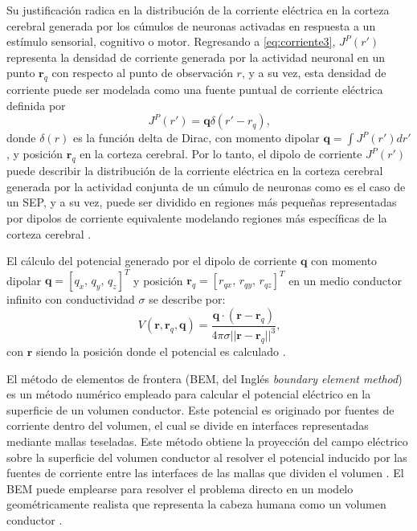 Su justificación radica en la distribución de la corriente eléctrica en la corteza cerebral generada por los cúmulos de neuronas activadas en respuesta a un estímulo sensorial, cognitivo o motor.
Regresando a \cref{eq:corriente3}, $J^{P}(r')$ representa la densidad de corriente generada por la actividad neuronal en un punto $\mathbf{r}_{q}$ con respecto al punto de
observación $r$, y a su vez, esta densidad de corriente puede ser modelada como una fuente puntual de corriente eléctrica definida por
\begin{equation}
	J^{P}(r') = \mathbf{q} \delta(r' - r_{q})\text{,} \label{eq:corriente4}
\end{equation}
donde $\delta(r)$ es la función delta de Dirac, con momento dipolar $\mathbf{q}=\int J^{P}(r') dr'$, y posición $\mathbf{r}_{q}$ en la corteza cerebral.
Por lo tanto, el dipolo de corriente $J^{P}(r')$ puede describir la distribución de la corriente eléctrica en la corteza cerebral generada por la actividad conjunta de un cúmulo de neuronas como es el caso de un SEP, y a su vez, puede ser dividido en regiones más pequeñas representadas por dipolos de corriente equivalente modelando regiones más específicas de la corteza cerebral \cite{Baillet2001}.

El cálculo del potencial generado por el dipolo de corriente $\mathbf{q}$ con momento dipolar  $\mathbf{q} = [q_x,\,q_y,\,q_z]^T$ y posición $\mathbf{r}_{q} = [r_{qx},\,r_{qy},\,r_{qz}]^T$ en un medio conductor infinito con conductividad $\sigma$ se describe por: 
\begin{equation}
	\label{fdip}
	V(\mathbf{r},\mathbf{r}_{q},\mathbf{q})=\frac{\mathbf{q}\cdot(\mathbf{r}-\mathbf{r}_{q})}{4\pi \sigma {||\mathbf{r}-\mathbf{r}_{q}||}^{3}}\text{,}
\end{equation}
con $\mathbf{r}$ siendo la posición donde el potencial es calculado \cite{Hallez2007}.

El método de elementos de frontera (BEM, del Inglés \emph{boundary element method}) es un método numérico empleado para calcular el potencial eléctrico en la superficie de un volumen conductor. Este potencial es originado por fuentes de corriente dentro del volumen, el cual se divide en interfaces representadas mediante mallas teseladas.
Este método obtiene la proyección del campo eléctrico sobre la superficie del volumen conductor al resolver el potencial inducido por las fuentes de corriente entre las interfaces de las mallas que dividen el volumen \cite{Hallez2007}.
El BEM puede emplearse para resolver el problema directo en un modelo geométricamente realista que representa la cabeza humana como un volumen conductor \cite{Ermer2001}.

